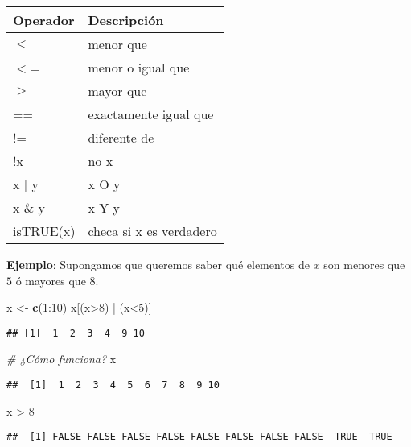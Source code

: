 \documentclass[]{article}
\newenvironment{Shaded}{\begin{snugshade}}{\end{snugshade}}
\newcommand{\KeywordTok}[1]{\textcolor[rgb]{0.13,0.29,0.53}{\textbf{{#1}}}}
\newcommand{\DecValTok}[1]{\textcolor[rgb]{0.00,0.00,0.81}{{#1}}}
\newcommand{\StringTok}[1]{\textcolor[rgb]{0.31,0.60,0.02}{{#1}}}
\newcommand{\CommentTok}[1]{\textcolor[rgb]{0.56,0.35,0.01}{\textit{{#1}}}}
\newcommand{\NormalTok}[1]{{#1}}
\begin{document}
\begin{table}[ht]
\centering
\begin{tabular}{ll}
  \hline
Operador & Descripción \\ 
  \hline
$<$ & menor que \\ 
  $<$= & menor o igual que \\ 
  $>$ & mayor que \\ 
  == & exactamente igual que \\ 
  != & diferente de \\ 
  !x &  no x \\ 
  x $|$ y & x O y \\ 
  x \& y & x Y y \\ 
  isTRUE(x) & checa si x es verdadero \\ 
   \hline
\end{tabular}
\end{table}

\textbf{Ejemplo}: Supongamos que queremos saber qué elementos de $x$ son
menores que $5$ ó mayores que $8$.

\begin{Shaded}
\begin{Highlighting}[]
\NormalTok{x <-}\StringTok{ }\KeywordTok{c}\NormalTok{(}\DecValTok{1}\NormalTok{:}\DecValTok{10}\NormalTok{)}
\NormalTok{x[(x>}\DecValTok{8}\NormalTok{) |}\StringTok{ }\NormalTok{(x<}\DecValTok{5}\NormalTok{)]}
\end{Highlighting}
\end{Shaded}

\begin{verbatim}
## [1]  1  2  3  4  9 10
\end{verbatim}

\begin{Shaded}
\begin{Highlighting}[]
\CommentTok{# ¿Cómo funciona?}
\NormalTok{x}
\end{Highlighting}
\end{Shaded}

\begin{verbatim}
##  [1]  1  2  3  4  5  6  7  8  9 10
\end{verbatim}

\begin{Shaded}
\begin{Highlighting}[]
\NormalTok{x >}\StringTok{ }\DecValTok{8}
\end{Highlighting}
\end{Shaded}

\begin{verbatim}
##  [1] FALSE FALSE FALSE FALSE FALSE FALSE FALSE FALSE  TRUE  TRUE
\end{verbatim}
\end{document}
